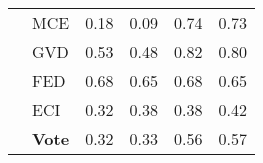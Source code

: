 \begin{tabularx}{\linewidth}{*{6}{X}}
 & MCE & {\cellcolor[HTML]{FDC6B0}} \color[HTML]{000000} 0.18 & {\cellcolor[HTML]{B0D2E7}} \color[HTML]{000000} 0.09  & {\cellcolor[HTML]{9C0D14}} \color[HTML]{F1F1F1} 0.74 & {\cellcolor[HTML]{084488}} \color[HTML]{F1F1F1} 0.73 \\
 & GVD & {\cellcolor[HTML]{EA362A}} \color[HTML]{F1F1F1} 0.53 & {\cellcolor[HTML]{3282BE}} \color[HTML]{F1F1F1} 0.48  & {\cellcolor[HTML]{67000D}} \color[HTML]{F1F1F1} 0.82 & {\cellcolor[HTML]{08306B}} \color[HTML]{F1F1F1} 0.80 \\
 & FED & {\cellcolor[HTML]{B51318}} \color[HTML]{F1F1F1} 0.68 & {\cellcolor[HTML]{0C56A0}} \color[HTML]{F1F1F1} 0.65  & {\cellcolor[HTML]{B51318}} \color[HTML]{F1F1F1} 0.68 & {\cellcolor[HTML]{0C56A0}} \color[HTML]{F1F1F1} 0.65 \\
 & ECI & {\cellcolor[HTML]{FC8D6D}} \color[HTML]{F1F1F1} 0.32 & {\cellcolor[HTML]{4D99CA}} \color[HTML]{F1F1F1} 0.38  & {\cellcolor[HTML]{FB7656}} \color[HTML]{F1F1F1} 0.38 & {\cellcolor[HTML]{3F8FC5}} \color[HTML]{F1F1F1} 0.42 \\
 & \textbf{Vote} & {\cellcolor[HTML]{FC8D6D}} \color[HTML]{F1F1F1} 0.32 & {\cellcolor[HTML]{5BA3D0}} \color[HTML]{F1F1F1} 0.33  & {\cellcolor[HTML]{E02C26}} \color[HTML]{F1F1F1} 0.56 & {\cellcolor[HTML]{1C6AB0}} \color[HTML]{F1F1F1} 0.57 \\
\bottomrule
\end{tabularx}
